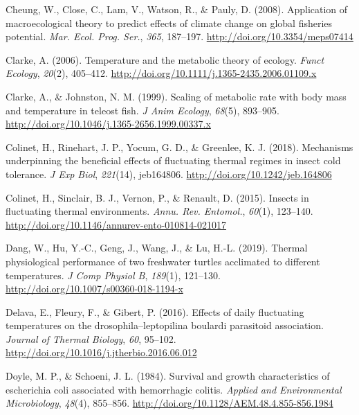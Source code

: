\documentclass[12pt,twoside]{reedthesis}
\begin{document}
\leavevmode\hypertarget{ref-cheung_application_2008}{}%
Cheung, W., Close, C., Lam, V., Watson, R., \& Pauly, D. (2008). Application of macroecological theory to predict effects of climate change on global fisheries potential. \emph{Mar. Ecol. Prog. Ser.}, \emph{365}, 187--197. \url{http://doi.org/10.3354/meps07414}

\leavevmode\hypertarget{ref-clarke_temperature_2006}{}%
Clarke, A. (2006). Temperature and the metabolic theory of ecology. \emph{Funct Ecology}, \emph{20}(2), 405--412. \url{http://doi.org/10.1111/j.1365-2435.2006.01109.x}

\leavevmode\hypertarget{ref-clarke_scaling_1999}{}%
Clarke, A., \& Johnston, N. M. (1999). Scaling of metabolic rate with body mass and temperature in teleost fish. \emph{J Anim Ecology}, \emph{68}(5), 893--905. \url{http://doi.org/10.1046/j.1365-2656.1999.00337.x}

\leavevmode\hypertarget{ref-colinet_mechanisms_2018}{}%
Colinet, H., Rinehart, J. P., Yocum, G. D., \& Greenlee, K. J. (2018). Mechanisms underpinning the beneficial effects of fluctuating thermal regimes in insect cold tolerance. \emph{J Exp Biol}, \emph{221}(14), jeb164806. \url{http://doi.org/10.1242/jeb.164806}

\leavevmode\hypertarget{ref-colinet_insects_2015}{}%
Colinet, H., Sinclair, B. J., Vernon, P., \& Renault, D. (2015). Insects in fluctuating thermal environments. \emph{Annu. Rev. Entomol.}, \emph{60}(1), 123--140. \url{http://doi.org/10.1146/annurev-ento-010814-021017}

\leavevmode\hypertarget{ref-dang_thermal_2019}{}%
Dang, W., Hu, Y.-C., Geng, J., Wang, J., \& Lu, H.-L. (2019). Thermal physiological performance of two freshwater turtles acclimated to different temperatures. \emph{J Comp Physiol B}, \emph{189}(1), 121--130. \url{http://doi.org/10.1007/s00360-018-1194-x}

\leavevmode\hypertarget{ref-delava_effects_2016}{}%
Delava, E., Fleury, F., \& Gibert, P. (2016). Effects of daily fluctuating temperatures on the drosophila--leptopilina boulardi parasitoid association. \emph{Journal of Thermal Biology}, \emph{60}, 95--102. \url{http://doi.org/10.1016/j.jtherbio.2016.06.012}

\leavevmode\hypertarget{ref-doyle_survival_1984}{}%
Doyle, M. P., \& Schoeni, J. L. (1984). Survival and growth characteristics of escherichia coli associated with hemorrhagic colitis. \emph{Applied and Environmental Microbiology}, \emph{48}(4), 855--856. \url{http://doi.org/10.1128/AEM.48.4.855-856.1984}
\end{document}
